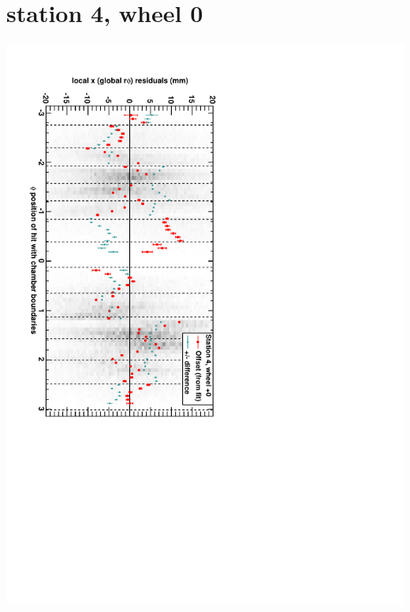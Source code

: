 \documentclass[compress]{beamer}
\begin{document}
\section*{station 4, wheel 0}
\begin{frame} \vfill \mbox{\hspace{-1 cm}\includegraphics[height=1.2\linewidth, angle=90]{DTrphiVsPhi_st4_whC.pdf}} \end{frame}
\end{document}
